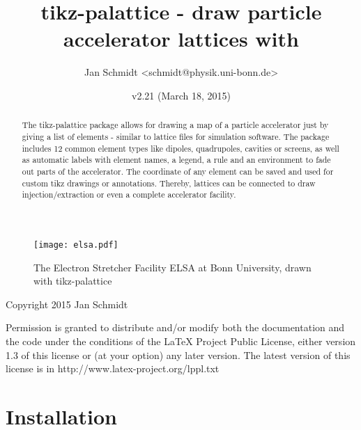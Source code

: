 \documentclass[a4paper]{scrartcl}
\author{Jan Schmidt <schmidt@physik.uni-bonn.de>}
\date{v2.21 (March 18, 2015)}
\title{tikz-palattice - draw particle accelerator lattices with \tikzlabel}
\begin{document}

\maketitle

\begin{abstract}
  The tikz-palattice package allows for drawing a map of a particle accelerator just by
  giving a list of elements - similar to lattice files for simulation software. The
  package includes 12 common element types like dipoles, quadrupoles, cavities or screens,
  as well as automatic labels with element names, a legend, a rule and an environment to
  fade out parts of the accelerator. The coordinate of any element can be saved and used
  for custom tikz drawings or annotations. Thereby, lattices can be connected to draw
  injection/extraction or even a complete accelerator facility.
\end{abstract}


\begin{figure}[h]
  \centering
  \texttt{[image: elsa.pdf]}
  \caption{The Electron Stretcher Facility ELSA at Bonn University, drawn with
    tikz-palattice}
\label{fig:elsa}
\end{figure}


\clearpage
\parindent=0pt
Copyright 2015 Jan Schmidt

\medskip
Permission is granted to distribute and/or modify both the documentation and the code
under the conditions of the LaTeX Project Public License, either version 1.3 of this
license or (at your option) any later version. The latest version of this license is in
http://www.latex-project.org/lppl.txt

\tableofcontents

\section{Installation}
\label{sec-1}
\end{document}
